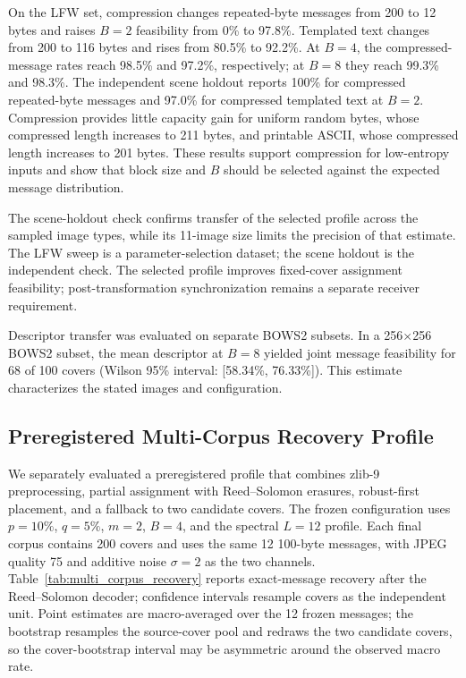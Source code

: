 \documentclass[preprint,12pt]{elsarticle}
\theoremstyle{plain}
\begin{document}
On the LFW set, compression changes repeated-byte messages from 200 to 12
bytes and raises $B=2$ feasibility from 0\% to 97.8\%. Templated text changes
from 200 to 116 bytes and rises from 80.5\% to 92.2\%. At $B=4$, the
compressed-message rates reach 98.5\% and 97.2\%, respectively; at $B=8$ they
reach 99.3\% and 98.3\%. The independent scene holdout reports 100\% for
compressed repeated-byte messages and 97.0\% for compressed templated text at
$B=2$. Compression provides little capacity gain for uniform random bytes,
whose compressed length increases to 211 bytes, and printable ASCII, whose
compressed length increases to 201 bytes. These results support compression
for low-entropy inputs and show that block size and $B$ should be selected
against the expected message distribution.

\begin{table}[!t]
\centering
\small
\caption{Lossless Preprocessing and Assignment Feasibility at 200 Source Bytes}
\label{tab:preprocessing_capacity}
\resizebox{\linewidth}{!}{}
\end{table}

The scene-holdout check confirms transfer of the selected profile across the
sampled image types, while its 11-image size limits the precision of that
estimate. The LFW sweep is a parameter-selection dataset; the scene holdout is
the independent check. The selected profile improves fixed-cover assignment
feasibility; post-transformation synchronization remains a separate receiver
requirement.

Descriptor transfer was evaluated on separate BOWS2 subsets. In a
256$\times$256 BOWS2 subset, the mean descriptor at $B=8$ yielded joint
message feasibility for 68 of 100 covers (Wilson 95\% interval:
[58.34\%, 76.33\%]). This estimate characterizes the stated images and
configuration.

\subsection{Preregistered Multi-Corpus Recovery Profile}
\label{sec:multi_corpus_recovery}

We separately evaluated a preregistered profile that combines zlib-9
preprocessing, partial assignment with Reed--Solomon erasures, robust-first
placement, and a fallback to two candidate covers. The frozen configuration
uses $p=10\%$, $q=5\%$, $m=2$, $B=4$, and the spectral $L=12$ profile. Each
final corpus contains 200 covers and uses the same 12 100-byte messages, with
JPEG quality 75 and additive noise $\sigma=2$ as the two channels.
Table~\ref{tab:multi_corpus_recovery} reports exact-message recovery after the
Reed--Solomon decoder; confidence intervals resample covers as the independent
unit. Point estimates are macro-averaged over the 12 frozen
messages; the bootstrap resamples the source-cover pool and redraws the two
candidate covers, so the cover-bootstrap interval may be asymmetric around
the observed macro rate.
\end{document}
